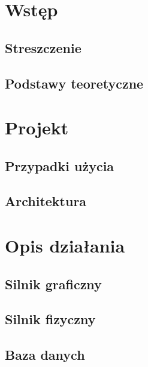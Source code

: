 


	
	\newpage
	
	\newpage

	\tableofcontents
	\newpage

	\chapter{Wstęp}\label{chap:wstęp}
	\section{Streszczenie}\label{sec:streszczenie}
	
	\newpage
	\section{Podstawy teoretyczne}\label{sec:podstawy teoretyczne}
	

	\chapter{Projekt}\label{chap:projekt}
	\section{Przypadki użycia}\label{sec:przypadki użycia}
	
	\section{Architektura}\label{sec:architektura}
	

	\chapter{Opis działania}\label{chap:opis dzialania}
	\section{Silnik graficzny}\label{sec:silnik graficzny}
	
	\section{Silnik fizyczny}\label{sec:silnik fizyczny}
	
	\section{Baza danych}\label{sec:baza danych}
	

